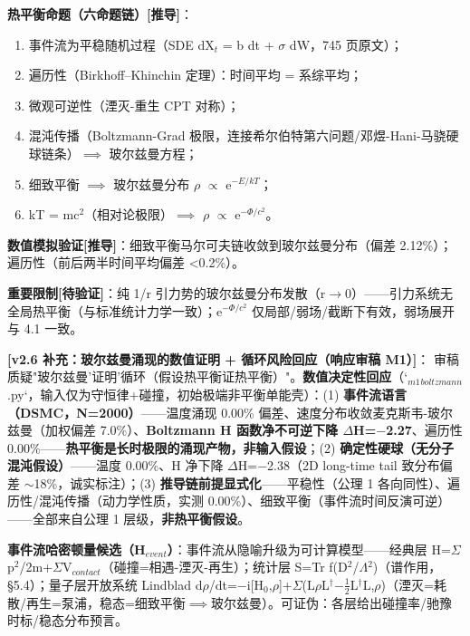 \documentclass[UTF8,fontset=windows]{csoarticle}
\newcommand{\mtag}[1]{\textbf{[#1]}}
\newcommand{\up}[1]{\ensuremath{^{#1}}}
\newcommand{\down}[1]{\ensuremath{_{#1}}}
\begin{document}
\textbf{热平衡命题（六命题链）}\mtag{推导}：
\begin{enumerate}
\item 事件流为平稳随机过程（SDE dX\down{t} = b dt + \ensuremath{\sigma} dW，745 页原文）；
\item 遍历性（Birkhoff--Khinchin 定理）：时间平均 = 系综平均；
\item 微观可逆性（湮灭-重生 CPT 对称）；
\item 混沌传播（Boltzmann-Grad 极限，连接希尔伯特第六问题/邓煜-Hani-马骁硬球链条）\ensuremath{\implies} 玻尔兹曼方程；
\item 细致平衡 \ensuremath{\implies} 玻尔兹曼分布 \ensuremath{\rho} \ensuremath{\propto} e\up{-E/kT}；
\item kT = mc\up{2}（相对论极限）\ensuremath{\implies} \ensuremath{\rho} \ensuremath{\propto} e\up{-\Phi{}/c^{2}}。
\end{enumerate}

\textbf{数值模拟验证}\mtag{推导}：细致平衡马尔可夫链收敛到玻尔兹曼分布（偏差 2.12\%）；遍历性（前后两半时间平均偏差 <0.2\%）。

\textbf{重要限制}\mtag{待验证}：纯 1/r 引力势的玻尔兹曼分布发散（r\ensuremath{\to}0）------引力系统无全局热平衡（与标准统计力学一致）；e\up{-\Phi{}/c^{2}} 仅局部/弱场/截断下有效，弱场展开与 4.1 一致。

\textbf{\mtag{v2.6 补充：玻尔兹曼涌现的数值证明 + 循环风险回应（响应审稿 M1）}}：
审稿质疑"玻尔兹曼'证明'循环（假设热平衡证热平衡）"。\textbf{数值决定性回应}（`\down{m1}\down{boltzmann}.py`，输入仅为守恒律+碰撞，初始极端非平衡单能壳）：(1) \textbf{事件流语言（DSMC，N=2000）}------温度涌现 0.00\% 偏差、速度分布收敛麦克斯韦-玻尔兹曼（加权偏差 7.0\%）、\textbf{Boltzmann H 函数净不可逆下降 \ensuremath{\Delta}H=\ensuremath{-}2.27}、遍历性 0.00\%------\textbf{热平衡是长时极限的涌现产物，非输入假设}；(2) \textbf{确定性硬球（无分子混沌假设）}------温度 0.00\%、H 净下降 \ensuremath{\Delta}H=\ensuremath{-}2.38（2D long-time tail 致分布偏差 \ensuremath{\sim}18\%，诚实标注）；(3) \textbf{推导链前提显式化}------平稳性（公理 1 各向同性）、遍历性/混沌传播（动力学性质，实测 0.00\%）、细致平衡（事件流时间反演可逆）------全部来自公理 1 层级，\textbf{非热平衡假设}。

\textbf{事件流哈密顿量候选（H\down{event}）}：事件流从隐喻升级为可计算模型------经典层 H=\ensuremath{\Sigma}p\up{2}/2m+\ensuremath{\Sigma}V\down{contact}（碰撞=相遇-湮灭-再生）；统计层 S=Tr f(D\up{2}/\ensuremath{\Lambda}\up{2})（谱作用，\S{}5.4）；量子层开放系统 Lindblad d\ensuremath{\rho}/dt=\ensuremath{-}i[H\down{0},\ensuremath{\rho}]+\ensuremath{\Sigma}(L\ensuremath{\rho}L\ensuremath{^\dagger}\ensuremath{-}\ensuremath{\tfrac12}{L\ensuremath{^\dagger}L,\ensuremath{\rho}})（湮灭=耗散/再生=泵浦，稳态=细致平衡\ensuremath{\implies}玻尔兹曼）。可证伪：各层给出碰撞率/驰豫时标/稳态分布预言。
\end{document}
